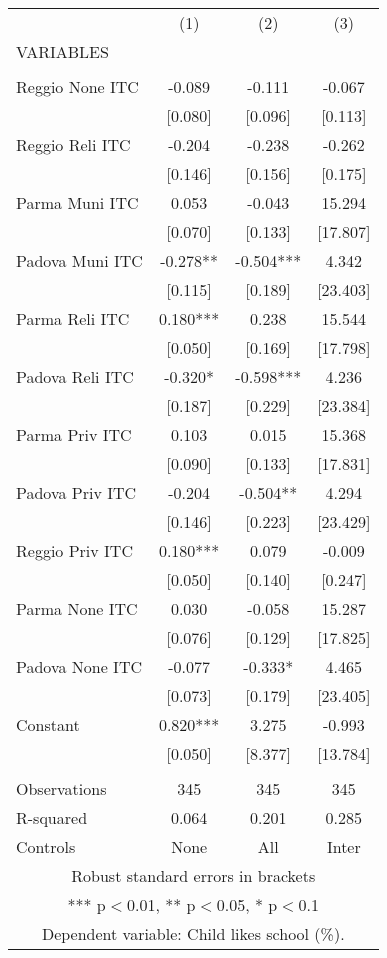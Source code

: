 \begin{tabular}{lccc} \hline
 & (1) & (2) & (3) \\
VARIABLES &  &  &  \\ \hline
 &  &  &  \\
Reggio None ITC & -0.089 & -0.111 & -0.067 \\
 & [0.080] & [0.096] & [0.113] \\
Reggio Reli ITC & -0.204 & -0.238 & -0.262 \\
 & [0.146] & [0.156] & [0.175] \\
Parma Muni ITC & 0.053 & -0.043 & 15.294 \\
 & [0.070] & [0.133] & [17.807] \\
Padova Muni ITC & -0.278** & -0.504*** & 4.342 \\
 & [0.115] & [0.189] & [23.403] \\
Parma Reli ITC & 0.180*** & 0.238 & 15.544 \\
 & [0.050] & [0.169] & [17.798] \\
Padova Reli ITC & -0.320* & -0.598*** & 4.236 \\
 & [0.187] & [0.229] & [23.384] \\
Parma Priv ITC & 0.103 & 0.015 & 15.368 \\
 & [0.090] & [0.133] & [17.831] \\
Padova Priv ITC & -0.204 & -0.504** & 4.294 \\
 & [0.146] & [0.223] & [23.429] \\
Reggio Priv ITC & 0.180*** & 0.079 & -0.009 \\
 & [0.050] & [0.140] & [0.247] \\
Parma None ITC & 0.030 & -0.058 & 15.287 \\
 & [0.076] & [0.129] & [17.825] \\
Padova None ITC & -0.077 & -0.333* & 4.465 \\
 & [0.073] & [0.179] & [23.405] \\
Constant & 0.820*** & 3.275 & -0.993 \\
 & [0.050] & [8.377] & [13.784] \\
 &  &  &  \\
Observations & 345 & 345 & 345 \\
R-squared & 0.064 & 0.201 & 0.285 \\
 Controls & None & All & Inter \\ \hline
\multicolumn{4}{c}{ Robust standard errors in brackets} \\
\multicolumn{4}{c}{ *** p$<$0.01, ** p$<$0.05, * p$<$0.1} \\
\multicolumn{4}{c}{ Dependent variable: Child likes school (\%).} \\
\end{tabular}
